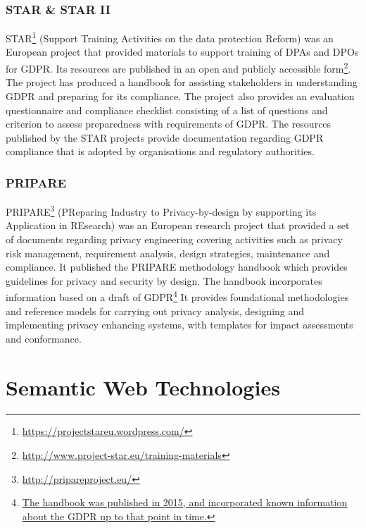 \subsubsection{STAR \& STAR II}
STAR\footnote{\url{https://projectstareu.wordpress.com/}} (Support Training Activities on the data protection Reform) was an European project that provided materials to support training of DPAs and DPOs for GDPR.
Its resources are published in an open and publicly accessible form\footnote{\url{http://www.project-star.eu/training-materials}}. The project has produced a handbook for assisting stakeholders in understanding GDPR and preparing for its compliance. The project also provides an evaluation questionnaire and compliance checklist \cite{GDPR_compliance_checklist_STAR} consisting of a list of questions and criterion to assess preparedness with requirements of GDPR. 
The resources published by the STAR projects provide documentation regarding GDPR compliance that is adopted by organisations and regulatory authorities.

\subsubsection{PRIPARE}
PRIPARE\footnote{\url{http://pripareproject.eu/}} (PReparing Industry to Privacy-by-design by supporting its Application in REsearch) was an European research project that provided a set of documents regarding privacy engineering covering activities such as privacy risk management, requirement analysis, design strategies, maintenance and compliance. It published the PRIPARE methodology handbook \cite{noauthor_privacy_2015} which provides  guidelines for privacy and security by design. The handbook incorporates information based on a draft of GDPR\footnote{\url{The handbook was published in 2015, and incorporated known information about the GDPR up to that point in time.}} It provides foundational methodologies and reference models for carrying out privacy analysis, designing and implementing privacy enhancing systems, with templates for impact assessments and conformance. 

\section{Semantic Web Technologies}\label{sec:background:semweb}

